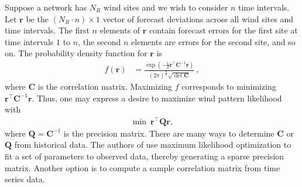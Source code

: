 \documentclass[journal,twoside]{IEEEtran}
\renewcommand{\vec}[1]{\mathbf{#1}}
\begin{document}
Suppose a network has $N_R$ wind sites and we wish to consider $n$ time intervals. Let $\vec{r}$ be the $(N_R\cdot n)\times 1$ vector of forecast deviations across all wind sites and time intervals. The first $n$ elements of $\vec{r}$ contain forecast errors for the first site at time intervals $1$ to $n$, the second $n$ elements are errors for the second site, and so on. The probability density function for $\vec{r}$ is
\begin{align}
f(\vec{r}) &= \frac{\exp \left(-\frac{1}{2} \vec{r}^\top \mathbf{C}^{-1} \vec{r} \right)}{(2\pi)^{\frac{n}{2}}\sqrt{\det \mathbf{C}}}~,
\end{align}
where $\mathbf{C}$ is the correlation matrix. Maximizing $f$ corresponds to minimizing $\vec{r}^\top \mathbf{C}^{-1} \vec{r}$. Thus, one may express a desire to maximize wind pattern likelihood with
\begin{align}
\label{eq:obj}\min~ \vec{r}^\top \mathbf{Q} \vec{r},
\end{align}
where $\mathbf{Q}=\mathbf{C}^{-1}$ is the precision matrix. There are many ways to determine $\mathbf{C}$ or $\mathbf{Q}$ from historical data. The authors of \cite{tastu2015} use maximum likelihood optimization to fit a set of parameters to observed data, thereby generating a sparse precision matrix. Another option is to compute a sample correlation matrix from time series data.








\end{document}
